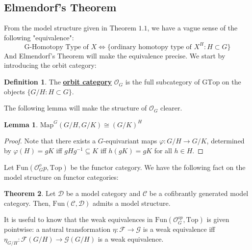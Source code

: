 \documentclass{article}
\theoremstyle{definition}
\newtheorem{theorem}{Theorem}[section]
\theoremstyle{definition}
\newtheorem{definition}{Definition}[theorem]
\theoremstyle{definition}
\theoremstyle{definition}
\theoremstyle{definition}
\newtheorem{lemma}[theorem]{Lemma}
\theoremstyle{definition}
\theoremstyle{definition}
\begin{document}
    \subsection{Elmendorf's Theorem}
    From the model structure given in Theorem $1.1$, we have a vague sense of the following "equivalence":
    \[\textrm{G-Homotopy Type of } X\Leftrightarrow \{ \textrm{ordinary homotopy type of } X^H:H\subset G \}\]
    And Elmendorf's Theorem will make the equivalence precise. We start by introducing the orbit category:
    
    \begin{tcolorbox}[colback=purple!5!white,colframe=purple!75!black]
    \begin{definition}
    The \underline{\textbf{orbit category}} $\mathcal{O}_G$ is the full subcategory of $\textrm{GTop}$ on the objects $\{G/H: H\subset G\}$.
    \end{definition}
    \end{tcolorbox}
    The following lemma will make the structure of $\mathcal{O}_G$ clearer.
    
    \begin{tcolorbox}
    \begin{lemma}
    $\textrm{Map}^G(G/H,G/K)\cong (G/K)^H$
    \end{lemma}
    \end{tcolorbox}
    \begin{proof}
        Note that there exists a $G$-equivariant maps $\varphi: G/H\to G/K$, determined by $\varphi(H)=gK$ iff $gHg^{-1}\subseteq K$ iff $h(gK)=gK$ for all $h\in H$. 
    \end{proof}
    
    Let $\textrm{Fun}(\mathcal{O}_G^op,\textrm{Top})$ be the functor category. We have the following fact on the model structure on functor categories:
    
    \begin{tcolorbox}[colback=red!5!white,colframe=red!30!white]
    \begin{theorem}
    Let $\mathcal{D}$ be a model category and $\mathcal{C}$ be a cofibrantly generated model category. Then, $\textrm{Fun}(\mathcal{C},\mathcal{D})$ admits a model structure. 
    \end{theorem}
    \end{tcolorbox}
    
    It is useful to know that the weak equivalences in $\textrm{Fun}(\mathcal{O}^{op}_G,\textrm{Top})$ is given pointwise: a natural transformation $\eta: \mathcal{F}\to \mathcal{G}$ is a weak equivalence iff $\eta_{G/H}:\mathcal{F}(G/H)\to \mathcal{G}(G/H) $ is a weak equivalence. 
    
\end{document}
